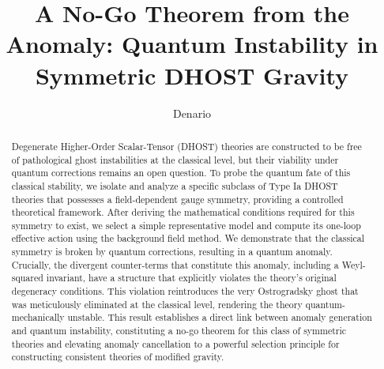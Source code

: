 \documentclass[twocolumn]{aastex631}
\begin{document}
\title{A No-Go Theorem from the Anomaly: Quantum Instability in Symmetric DHOST Gravity}

\author{Denario}

\begin{abstract}
Degenerate Higher-Order Scalar-Tensor (DHOST) theories are constructed to be free of pathological ghost instabilities at the classical level, but their viability under quantum corrections remains an open question. To probe the quantum fate of this classical stability, we isolate and analyze a specific subclass of Type Ia DHOST theories that possesses a field-dependent gauge symmetry, providing a controlled theoretical framework. After deriving the mathematical conditions required for this symmetry to exist, we select a simple representative model and compute its one-loop effective action using the background field method. We demonstrate that the classical symmetry is broken by quantum corrections, resulting in a quantum anomaly. Crucially, the divergent counter-terms that constitute this anomaly, including a Weyl-squared invariant, have a structure that explicitly violates the theory's original degeneracy conditions. This violation reintroduces the very Ostrogradsky ghost that was meticulously eliminated at the classical level, rendering the theory quantum-mechanically unstable. This result establishes a direct link between anomaly generation and quantum instability, constituting a no-go theorem for this class of symmetric theories and elevating anomaly cancellation to a powerful selection principle for constructing consistent theories of modified gravity.
\end{abstract}

\end{document}

